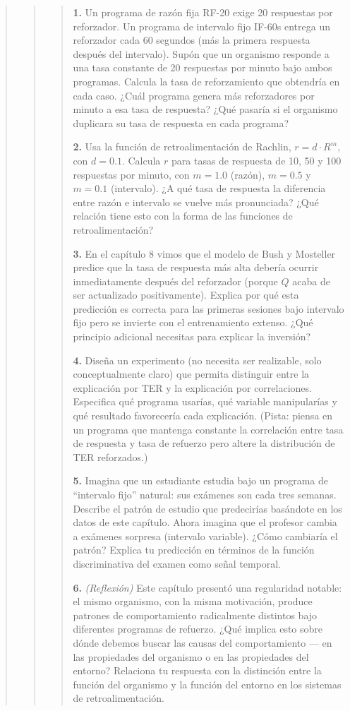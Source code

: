 \documentclass[
  letterpaper,
  DIV=11,
  numbers=noendperiod]{scrreprt}
\begin{document}
\begin{tcolorbox}[enhanced jigsaw, toprule=.15mm, arc=.35mm, colback=white, opacityback=0, colframe=quarto-callout-note-color-frame, breakable, rightrule=.15mm, left=2mm, leftrule=.75mm, bottomrule=.15mm]
\begin{quote}
\begin{quote}
\begin{quote}
\textbf{1.} Un programa de razón fija RF-20 exige 20 respuestas por
reforzador. Un programa de intervalo fijo IF-60s entrega un reforzador
cada 60 segundos (más la primera respuesta después del intervalo). Supón
que un organismo responde a una tasa constante de 20 respuestas por
minuto bajo ambos programas. Calcula la tasa de reforzamiento que
obtendría en cada caso. ¿Cuál programa genera más reforzadores por
minuto a esa tasa de respuesta? ¿Qué pasaría si el organismo duplicara
su tasa de respuesta en cada programa?

\textbf{2.} Usa la función de retroalimentación de Rachlin,
\(r = d \cdot R^m\), con \(d = 0.1\). Calcula \(r\) para tasas de
respuesta de 10, 50 y 100 respuestas por minuto, con \(m = 1.0\)
(razón), \(m = 0.5\) y \(m = 0.1\) (intervalo). ¿A qué tasa de respuesta
la diferencia entre razón e intervalo se vuelve más pronunciada? ¿Qué
relación tiene esto con la forma de las funciones de retroalimentación?

\textbf{3.} En el capítulo 8 vimos que el modelo de Bush y Mosteller
predice que la tasa de respuesta más alta debería ocurrir inmediatamente
después del reforzador (porque \(Q\) acaba de ser actualizado
positivamente). Explica por qué esta predicción es correcta para las
primeras sesiones bajo intervalo fijo pero se invierte con el
entrenamiento extenso. ¿Qué principio adicional necesitas para explicar
la inversión?

\textbf{4.} Diseña un experimento (no necesita ser realizable, solo
conceptualmente claro) que permita distinguir entre la explicación por
TER y la explicación por correlaciones. Especifica qué programa usarías,
qué variable manipularías y qué resultado favorecería cada explicación.
(Pista: piensa en un programa que mantenga constante la correlación
entre tasa de respuesta y tasa de refuerzo pero altere la distribución
de TER reforzados.)

\textbf{5.} Imagina que un estudiante estudia bajo un programa de
``intervalo fijo'' natural: sus exámenes son cada tres semanas. Describe
el patrón de estudio que predecirías basándote en los datos de este
capítulo. Ahora imagina que el profesor cambia a exámenes sorpresa
(intervalo variable). ¿Cómo cambiaría el patrón? Explica tu predicción
en términos de la función discriminativa del examen como señal temporal.

\textbf{6.} \emph{(Reflexión)} Este capítulo presentó una regularidad
notable: el mismo organismo, con la misma motivación, produce patrones
de comportamiento radicalmente distintos bajo diferentes programas de
refuerzo. ¿Qué implica esto sobre dónde debemos buscar las causas del
comportamiento --- en las propiedades del organismo o en las propiedades
del entorno? Relaciona tu respuesta con la distinción entre la función
del organismo y la función del entorno en los sistemas de
retroalimentación.


\end{quote}
\end{quote}
\end{quote}
\end{tcolorbox}
\end{document}
